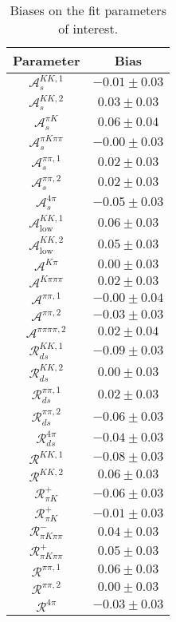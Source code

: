 \begin{table}
  \centering
  \begin{tabular}{cc}
  \toprule
      Parameter & Bias \\
  \midrule
      $\mathcal{A}_s^{KK,1}$ & $-0.01 \pm 0.03$ \\
      $\mathcal{A}_s^{KK,2}$ & $0.03 \pm 0.03$ \\
      $\mathcal{A}_s^{\pi K}$ & $0.06 \pm 0.04$ \\
      $\mathcal{A}_s^{\pi K\pi\pi}$ & $-0.00 \pm 0.03$ \\
      $\mathcal{A}_s^{\pi\pi,1}$ & $0.02 \pm 0.03$ \\
      $\mathcal{A}_s^{\pi\pi,2}$ & $0.02 \pm 0.03$ \\
      $\mathcal{A}_s^{4\pi}$ & $-0.05 \pm 0.03$ \\
      $\mathcal{A}_\mathrm{low}^{KK,1}$ & $0.06 \pm 0.03$ \\
      $\mathcal{A}_\mathrm{low}^{KK,2}$ & $0.05 \pm 0.03$ \\
      $\mathcal{A}^{K\pi}$ & $0.00 \pm 0.03$ \\
      $\mathcal{A}^{K\pi\pi\pi}$ & $0.02 \pm 0.03$ \\
      $\mathcal{A}^{\pi\pi,1}$ & $-0.00 \pm 0.04$ \\
      $\mathcal{A}^{\pi\pi,2}$ & $-0.03 \pm 0.03$ \\
      $\mathcal{A}^{\pi\pi\pi\pi,2}$ & $0.02 \pm 0.04$ \\
      $\mathcal{R}_{ds}^{KK,1}$ & $-0.09 \pm 0.03$ \\
      $\mathcal{R}_{ds}^{KK,2}$ & $0.00 \pm 0.03$ \\
      $\mathcal{R}_{ds}^{\pi\pi,1}$ & $0.02 \pm 0.03$ \\
      $\mathcal{R}_{ds}^{\pi\pi,2}$ & $-0.06 \pm 0.03$ \\
      $\mathcal{R}_{ds}^{4\pi}$ & $-0.04 \pm 0.03$ \\
      $\mathcal{R}^{KK,1}$ & $-0.08 \pm 0.03$ \\
      $\mathcal{R}^{KK,2}$ & $0.06 \pm 0.03$ \\
      $\mathcal{R}_{\pi K}^+$ & $-0.06 \pm 0.03$ \\
      $\mathcal{R}_{\pi K}^+$ & $-0.01 \pm 0.03$ \\
      $\mathcal{R}_{\pi K\pi\pi}^-$ & $0.04 \pm 0.03$ \\
      $\mathcal{R}_{\pi K\pi\pi}^+$ & $0.05 \pm 0.03$ \\
      $\mathcal{R}^{\pi\pi,1}$ & $0.06 \pm 0.03$ \\
      $\mathcal{R}^{\pi\pi,2}$ & $0.00 \pm 0.03$ \\
      $\mathcal{R}^{4\pi}$ & $-0.03 \pm 0.03$ \\
      \bottomrule
  \end{tabular}
  \caption{Biases on the fit parameters of interest.}
\label{tab:biases}
\end{table}

